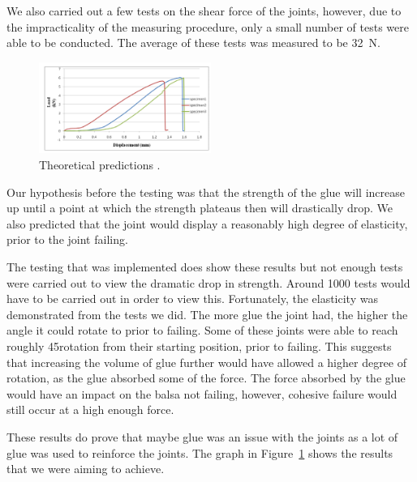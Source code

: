 \documentclass[12pt]{article}
\begin{document}
              
We also carried out a few tests on the shear force of the joints, however, due to the impracticality of the measuring procedure, only a small number of tests were able to be conducted. The average of these tests was measured to be 32~N.
                 \begin{figure}[h!]
                          \centering
                          \includegraphics[width=0.5\textwidth]{Articlegraph}
                          \caption{Theoretical predictions \citep{glue}.}
                          \label{graphg}
                 \end{figure}

Our hypothesis before the testing was that the strength of the glue will increase up until a point at which the strength plateaus then will drastically drop. We also predicted that the joint would display a reasonably high degree of elasticity, prior to the joint failing. 

The testing that was implemented does show these results but not enough tests were carried out to view the dramatic drop in strength. Around 1000 tests would have to be carried out in order to view this. 
Fortunately, the elasticity was demonstrated from the tests we did. The more glue the joint had, the higher the angle it could rotate to prior to failing. Some of these joints were able to reach roughly 45\textdegree rotation from their starting position, prior to failing. This suggests that increasing the volume of glue further would have allowed a higher degree of rotation, as the glue absorbed some of the force. The force absorbed by the glue would have an impact on the balsa not failing, however, cohesive failure would still occur at a high enough force.

These results do prove that maybe glue was an issue with the joints as a lot of glue was used to reinforce the joints.
The graph in Figure~\ref{graphg} shows the results that we were aiming to achieve.
\end{document}
